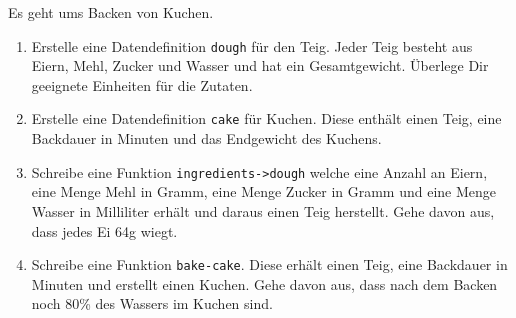 \begin{aufgabe}

  Es geht ums Backen von Kuchen.

  \begin{enumerate}
  \item Erstelle eine Datendefinition
    \texttt{dough} für den Teig.  Jeder Teig besteht aus Eiern, Mehl,
    Zucker und Wasser und hat ein Gesamtgewicht.  Überlege Dir
    geeignete Einheiten für die Zutaten.
  \item Erstelle eine Datendefinition \texttt{cake}
    für Kuchen.  Diese enthält einen Teig, eine Backdauer in Minuten und 
    das Endgewicht des Kuchens.
  \item Schreibe eine Funktion
    \texttt{ingredients->dough} welche eine Anzahl an Eiern, eine
    Menge Mehl in Gramm, eine Menge Zucker in Gramm und eine
    Menge Wasser in Milliliter erhält und daraus einen Teig
    herstellt. Gehe davon aus, dass jedes Ei 64g wiegt.
  \item Schreibe eine Funktion \texttt{bake-cake}. 
    Diese erhält einen Teig, eine Backdauer in Minuten und erstellt einen 
    Kuchen.  Gehe davon aus, dass nach dem Backen noch 80\% des
    Wassers im Kuchen sind.
  \end{enumerate}
  
\end{aufgabe}


